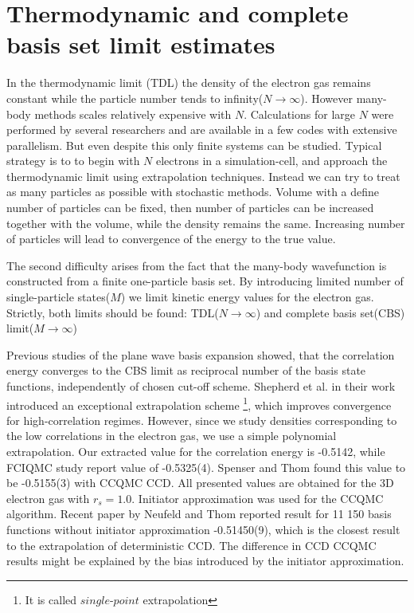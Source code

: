 \documentclass[twoside,english]{uiofysmaster}
\begin{document}
\section{Thermodynamic and complete basis set limit estimates}

In the thermodynamic limit (TDL) the density of the electron gas remains constant while the particle number tends to infinity($N\rightarrow \infty$). However many-body methods scales relatively expensive with $N$. Calculations for large $N$ were performed by several researchers and are available in a few codes with extensive parallelism. But even despite this only finite systems can be studied. Typical strategy is to to begin with $N$ electrons in a simulation-cell, and approach the thermodynamic limit using extrapolation techniques. Instead we can try to treat as many particles as possible with stochastic methods. Volume with a define number of particles can be fixed, then number of particles can be increased together with the volume, while the density remains the same. Increasing number of particles will lead to convergence of the energy to the true value.

The second difficulty arises from the fact that the many-body wavefunction is constructed from a finite one-particle basis set. By introducing limited number of single-particle states($M$) we limit kinetic energy values for the electron gas. Strictly, both limits should be found: TDL($N\rightarrow \infty$) and complete basis set(CBS) limit($M \rightarrow \infty$)

Previous studies \cite{ShepherdConvergencemanybodywavefunction2012} of the plane wave basis expansion showed, that the correlation energy converges to the  CBS limit as reciprocal number of the basis state functions, independently of chosen cut-off scheme. Shepherd et al. in their work introduced an exceptional extrapolation scheme \footnote{It is called $single$-$point$ extrapolation}, which improves convergence for high-correlation regimes. However, since we study densities corresponding to the low correlations in the electron gas, we use a simple polynomial extrapolation. Our extracted value for the correlation energy is -0.5142, while FCIQMC study report \cite{ShepherdInvestigationfullconfiguration2012} value of -0.5325(4). Spenser and Thom\cite{SpencerDevelopmentsstochasticcoupled2016} found this value to be -0.5155(3) with CCQMC CCD. All presented values are obtained for the 3D electron gas with $r_s=1.0$. Initiator approximation was used for the CCQMC algorithm. Recent paper by Neufeld and Thom\cite{Neufeldstudydenseuniform2017} reported result for 11 150 basis functions without initiator approximation -0.51450(9), which is the closest result to the extrapolation of deterministic CCD. The difference in CCD CCQMC results might be explained by the bias introduced by the initiator approximation.
\end{document}
